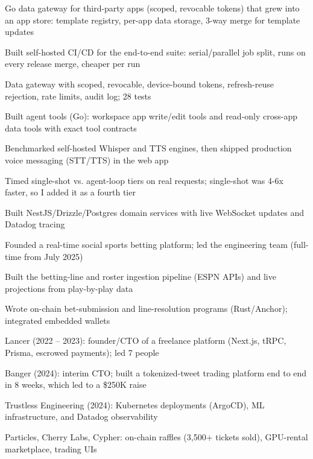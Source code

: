 \documentclass[print]{jack-resume}
\begin{document}
\begin{tightemize}
    \item Go data gateway for third-party apps (scoped, revocable tokens) that grew into an app store: template registry, per-app data storage, 3-way merge for template updates
    \item Built self-hosted CI/CD for the end-to-end suite: serial/parallel job split, runs on every release merge, cheaper per run
    \item Data gateway with scoped, revocable, device-bound tokens, refresh-reuse rejection, rate limits, audit log; 28 tests
    \item Built agent tools (Go): workspace app write/edit tools and read-only cross-app data tools with exact tool contracts
    \item Benchmarked self-hosted Whisper and TTS engines, then shipped production voice messaging (STT/TTS) in the web app
    \item Timed single-shot vs. agent-loop tiers on real requests; single-shot was 4-6x faster, so I added it as a fourth tier
\end{tightemize}
\sectionsep

\begin{tightemize}
    \item Built NestJS/Drizzle/Postgres domain services with live WebSocket updates and Datadog tracing
    \item Founded a real-time social sports betting platform; led the engineering team (full-time from July 2025)
    \item Built the betting-line and roster ingestion pipeline (ESPN APIs) and live projections from play-by-play data
    \item Wrote on-chain bet-submission and line-resolution programs (Rust/Anchor); integrated embedded wallets
\end{tightemize}
\sectionsep

\begin{tightemize}
    \item Lancer (2022 – 2023): founder/CTO of a freelance platform (Next.js, tRPC, Prisma, escrowed payments); led 7 people
    \item Banger (2024): interim CTO; built a tokenized-tweet trading platform end to end in 8 weeks, which led to a \$250K raise
    \item Trustless Engineering (2024): Kubernetes deployments (ArgoCD), ML infrastructure, and Datadog observability
    \item Particles, Cherry Labs, Cypher: on-chain raffles (3,500+ tickets sold), GPU-rental marketplace, trading UIs
\end{tightemize}
\sectionsep
\end{document}
